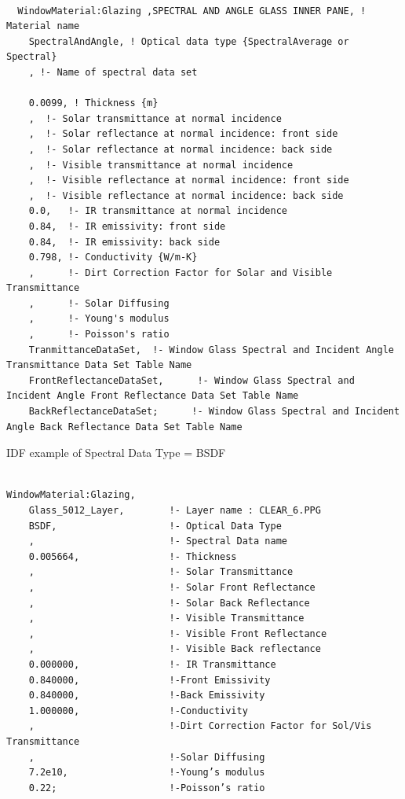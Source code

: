 \begin{lstlisting}

  WindowMaterial:Glazing ,SPECTRAL AND ANGLE GLASS INNER PANE, ! Material name
    SpectralAndAngle, ! Optical data type {SpectralAverage or Spectral}
    , !- Name of spectral data set

    0.0099, ! Thickness {m}
    ,  !- Solar transmittance at normal incidence
    ,  !- Solar reflectance at normal incidence: front side
    ,  !- Solar reflectance at normal incidence: back side
    ,  !- Visible transmittance at normal incidence
    ,  !- Visible reflectance at normal incidence: front side
    ,  !- Visible reflectance at normal incidence: back side
    0.0,   !- IR transmittance at normal incidence
    0.84,  !- IR emissivity: front side
    0.84,  !- IR emissivity: back side
    0.798, !- Conductivity {W/m-K}
    ,      !- Dirt Correction Factor for Solar and Visible Transmittance
    ,      !- Solar Diffusing
    ,      !- Young's modulus
    ,      !- Poisson's ratio
    TranmittanceDataSet,  !- Window Glass Spectral and Incident Angle Transmittance Data Set Table Name
    FrontReflectanceDataSet,      !- Window Glass Spectral and Incident Angle Front Reflectance Data Set Table Name
    BackReflectanceDataSet;      !- Window Glass Spectral and Incident Angle Back Reflectance Data Set Table Name

\end{lstlisting}

IDF example of Spectral Data Type = BSDF

\begin{lstlisting}

WindowMaterial:Glazing,
    Glass_5012_Layer,        !- Layer name : CLEAR_6.PPG
    BSDF,                    !- Optical Data Type
    ,                        !- Spectral Data name
    0.005664,                !- Thickness
    ,                        !- Solar Transmittance
    ,                        !- Solar Front Reflectance
    ,                        !- Solar Back Reflectance
    ,                        !- Visible Transmittance
    ,                        !- Visible Front Reflectance
    ,                        !- Visible Back reflectance
    0.000000,                !- IR Transmittance
    0.840000,                !-Front Emissivity
    0.840000,                !-Back Emissivity
    1.000000,                !-Conductivity
    ,                        !-Dirt Correction Factor for Sol/Vis Transmittance
    ,                        !-Solar Diffusing
    7.2e10,                  !-Young’s modulus
    0.22;                    !-Poisson’s ratio
\end{lstlisting}


